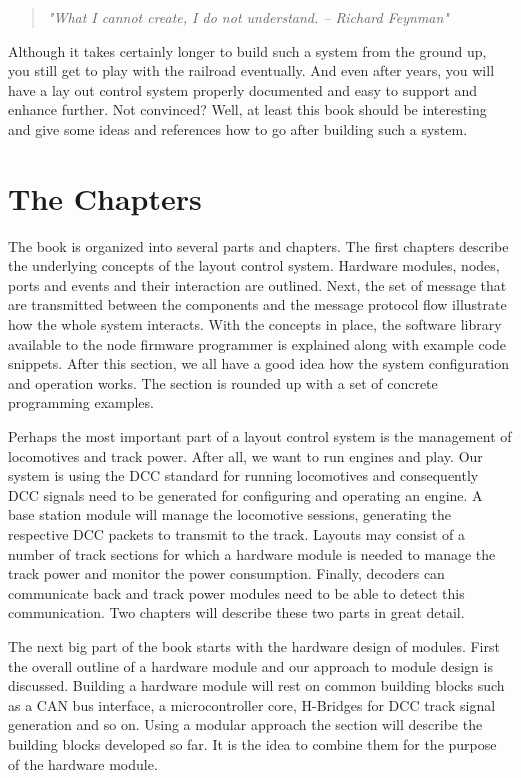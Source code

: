 \begin{quotation}
    \textit{ "What I cannot create, I do not understand. -- Richard Feynman"}
\end{quotation}

Although it takes certainly longer to build such a system from the ground up, you still get to play with the railroad eventually. And even after years, you will have a lay  out control system properly documented and easy to support and enhance further. Not convinced? Well, at least this book should be interesting and give some ideas and references how to go after building such a system.

\section{The Chapters}

The book is organized into several parts and chapters. The first chapters describe the underlying concepts of the layout control system. Hardware modules, nodes, ports and events and their interaction are outlined. Next, the set of message that are transmitted between the components and the message protocol flow illustrate how the whole system interacts. With the concepts in place, the software library available to the node firmware programmer is explained along with example code snippets. After this section, we all have a good idea how the system configuration and operation works. The section is rounded up with a set of concrete programming examples.

Perhaps the most important part of a layout control system is the management of locomotives and track power. After all, we want to run engines and play. Our system is using the DCC standard for running locomotives and consequently DCC signals need to be generated for configuring and operating an engine. A base station module will manage the locomotive sessions, generating the respective DCC packets to transmit to the track. Layouts may consist of a number of track sections for which a hardware module is needed to manage the track power and monitor the power consumption. Finally, decoders can communicate back and track power modules need to be able to detect this communication. Two chapters will describe these two parts in great detail.

The next big part of the book starts with the hardware design of modules. First the overall outline of a hardware module and our approach to module design is discussed. Building a hardware module will rest on common building blocks such as a CAN bus interface, a microcontroller core, H-Bridges for DCC track signal generation and so on. Using a modular approach the section will describe the building blocks developed so far. It is the idea to combine them for the purpose of the hardware module.

